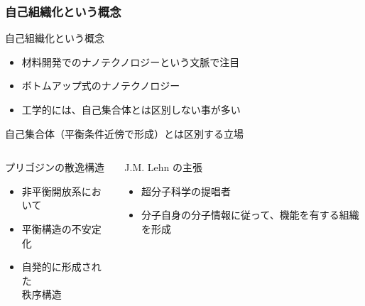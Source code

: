 \documentclass[12pt, dvipdfmx]{beamer}
\begin{document}
\begin{frame}
    \frametitle{自己組織化という概念}
    \begin{block}{自己組織化という概念}
        \begin{itemize}
            \item 材料開発でのナノテクノロジーという文脈で注目
            \item ボトムアップ式のナノテクノロジー
            \item 工学的には、自己集合体とは区別しない事が多い
        \end{itemize}
    \end{block}
    \begin{exampleblock}{自己集合体（平衡条件近傍で形成）とは区別する立場}
        \begin{columns}[T, onlytextwidth]
            \begin{alertblock}{プリゴジンの散逸構造}
                \begin{itemize}
                    \item 非平衡開放系において
                    \item 平衡構造の不安定化
                    \item 自発的に形成された\\秩序構造
                \end{itemize}
            \end{alertblock}
            \begin{alertblock}{J.M. Lehn の主張}
                \begin{itemize}
                    \item 超分子科学の提唱者
                    \item 分子自身の分子情報に従って、機能を有する組織を形成
                \end{itemize}
            \end{alertblock}
        \end{columns}
    \end{exampleblock}
\end{frame}
\end{document}
